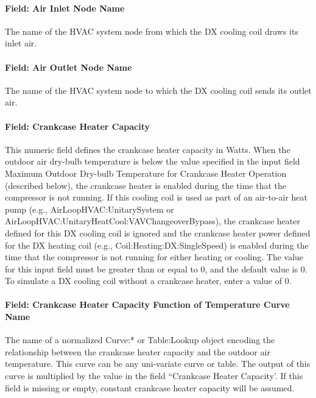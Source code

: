 \paragraph{Field: Air Inlet Node Name}\label{field-air-inlet-node-name-10}

The name of the HVAC system node from which the DX cooling coil draws its inlet air.

\paragraph{Field: Air Outlet Node Name}\label{field-air-outlet-node-name-10}

The name of the HVAC system node to which the DX cooling coil sends its outlet air.

\paragraph{Field: Crankcase Heater Capacity}\label{field-crankcase-heater-capacity-1}

This numeric field defines the crankcase heater capacity in Watts. When the outdoor air dry-bulb temperature is below the value specified in the input field Maximum Outdoor Dry-bulb Temperature for Crankcase Heater Operation (described below), the crankcase heater is enabled during the time that the compressor is not running. If this cooling coil is used as part of an air-to-air heat pump (e.g., AirLoopHVAC:UnitarySystem or AirLoopHVAC:UnitaryHeatCool:VAVChangeoverBypass), the crankcase heater defined for this DX cooling coil is ignored and the crankcase heater power defined for the DX heating coil (e.g., Coil:Heating:DX:SingleSpeed) is enabled during the time that the compressor is not running for either heating or cooling. The value for this input field must be greater than or equal to 0, and the default value is 0. To simulate a DX cooling coil without a crankcase heater, enter a value of 0.

\paragraph{Field: Crankcase Heater Capacity Function of Temperature Curve Name}

The name of a normalized Curve:* or Table:Lookup object encoding the relationship between the crankcase heater capacity and the outdoor air temperature. This curve can be any uni-variate curve or table. The output of this curve is multiplied by the value in the field ``Crankcase Heater Capacity'. If this field is missing or empty, constant crankcase heater capacity will be
assumed.

